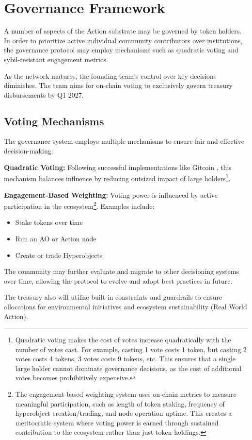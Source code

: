 \section{Governance Framework}

A number of aspects of the Action substrate may be governed by token holders. In order to prioritize active individual community contributors over institutions, the governance protocol may employ mechanisms such as quadratic voting and sybil-resistant engagement metrics. 

As the network matures, the founding team's control over key decisions diminishes. The team aims for on-chain voting to exclusively govern treasury disbursements by Q1 2027.

\subsection{Voting Mechanisms}

The governance system employs multiple mechanisms to ensure fair and effective decision-making:

\vspace{1em}

\noindent\textbf{Quadratic Voting:} Following successful implementations like Gitcoin \cite{Gitcoin2023}, this mechanism balances influence by reducing outsized impact of large holders\footnote{Quadratic voting makes the cost of votes increase quadratically with the number of votes cast. For example, casting 1 vote costs 1 token, but casting 2 votes costs 4 tokens, 3 votes costs 9 tokens, etc. This ensures that a single large holder cannot dominate governance decisions, as the cost of additional votes becomes prohibitively expensive.}.

\vspace{1em}

\noindent\textbf{Engagement-Based Weighting:} Voting power is influenced by active participation in the ecosystem\footnote{The engagement-based weighting system uses on-chain metrics to measure meaningful participation, such as length of token staking, frequency of hyperobject creation/trading, and node operation uptime. This creates a meritocratic system where voting power is earned through sustained contribution to the ecosystem rather than just token holdings.}. Examples include:
\begin{itemize}
\item Stake tokens over time
\item Run an AO or Action node
\item Create or trade Hyperobjects
\end{itemize}

The community may further evaluate and migrate to other decisioning systems over time, allowing the protocol to evolve and adopt best practices in future.

The treasury also will utilize built-in constraints and guardrails to ensure allocations for environmental initiatives and ecosystem sustainability (Real World Action).
